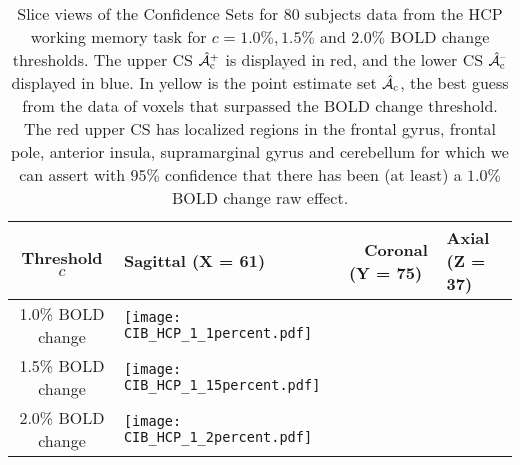 \begin{table}[htbp]
\hspace*{-0.5cm}
\begin{adjustbox}{center}
\centering
    \begin{tabular}{cm{50mm}m{50mm}m{50mm}}
       \toprule
         Threshold $c$ & \hspace{1.4cm} Sagittal (X = 61) & \ \hspace{1.2cm} Coronal (Y = 75) & \hspace{1.0cm} Axial (Z = 37)\\
        \midrule
        1.0\% BOLD change & \texttt{[image: CIB\_HCP\_1\_1percent.pdf]}\\
        1.5\% BOLD change & \texttt{[image: CIB\_HCP\_1\_15percent.pdf]}\\
        2.0\% BOLD change & \texttt{[image: CIB\_HCP\_1\_2percent.pdf]}\\
        \bottomrule
    \end{tabular}
\end{adjustbox}
    \caption{Slice views of the Confidence Sets for 80 subjects data from the HCP working memory task for $c = 1.0\%, 1.5\%$ and $2.0\%$ BOLD change thresholds. The upper CS $\operatorname{\hat{\mathcal{A}}_{c}^+}$ is displayed in red, and the lower CS $\operatorname{\hat{\mathcal{A}}_{c}^{\textrm{--}}}$ displayed in blue. In yellow is the point estimate set $\operatorname{\hat{\mathcal{A}}_{c}}$, the best guess from the data of voxels that surpassed the BOLD change threshold. The red upper CS has localized regions in the frontal gyrus, frontal pole, anterior insula, supramarginal gyrus and cerebellum for which we can assert with $95\%$ confidence that there has been (at least) a $1.0\%$ BOLD change raw effect.}
    \label{tbl:HCP_results_one}
\end{table}

